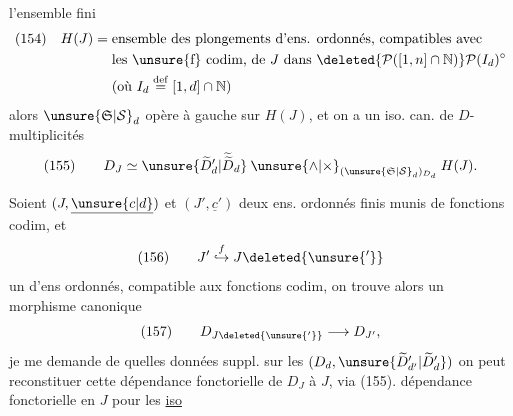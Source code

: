 l'ensemble fini
\[
\begin{aligned}
(154)\quad H(J)={}&\text{ensemble des plongements d'ens. ordonnés, compatibles avec}\\
&\text{les \unsure{f} codim, de }J\text{ dans }\deleted{\mathcal P([1,n]\cap\mathbb N)}\mathcal P(I_d)^\circ\\
&\text{(où }I_d\overset{\mathrm{def}}=[1,d]\cap\mathbb N\text{)}
\end{aligned}
\]
alors $\unsure{\mathfrak S|\mathcal S}_d$ opère à gauche sur $H(J)$, et on a un iso. can. de $D$-multiplicités
\[
(155)\qquad D_J\simeq\unsure{\widetilde D'_d|\widetilde{\widetilde D}_d}\mathbin{\unsure{\wedge|\times}}_{(\unsure{\mathfrak S|\mathcal S}_d)_{D_d}}H(J).
\]

Soient  $(J,\underline{\unsure{c|d}})$ et $(J',\underline{c}')$ deux ens. ordonnés finis munis de fonctions codim, et
\[
(156)\qquad J'\mathrel{\overset{f}{\hookrightarrow}}J\deleted{\unsure{'}}
\]
un  d'ens ordonnés, compatible aux fonctions codim, on trouve alors un  morphisme canonique
\[
(157)\qquad D_{J\deleted{\unsure{'}}}\longrightarrow D_{J'},
\]
je me demande  de quelles données suppl.  sur les $(D_d,\unsure{\widetilde D'_{d'}|\widetilde D'_d})$ on peut reconstituer cette dépendance fonctorielle de $D_J$  à $J$, via (155).   dépendance fonctorielle en $J$ pour les \uline{iso}

